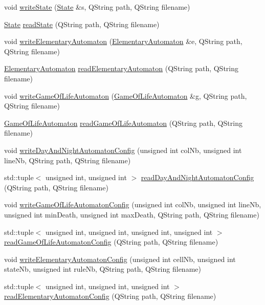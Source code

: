 \begin{DoxyCompactItemize}
\item 
void \mbox{\hyperlink{class_xml_automaton_data_manager_ae184eee52e68ad5557a01ab2b3f697a8}{write\+State}} (\mbox{\hyperlink{class_state}{State}} \&s, Q\+String path, Q\+String filename)
\item 
\mbox{\hyperlink{class_state}{State}} \mbox{\hyperlink{class_xml_automaton_data_manager_a5d5eea4ab9989ee0e412c38d56aa5fcf}{read\+State}} (Q\+String path, Q\+String filename)
\item 
void \mbox{\hyperlink{class_xml_automaton_data_manager_a4cd67227e959b0f302eb8d2214477886}{write\+Elementary\+Automaton}} (\mbox{\hyperlink{class_elementary_automaton}{Elementary\+Automaton}} \&e, Q\+String path, Q\+String filename)
\item 
\mbox{\hyperlink{class_elementary_automaton}{Elementary\+Automaton}} \mbox{\hyperlink{class_xml_automaton_data_manager_a1bfbd91aa176a1b18ee87630eec9929d}{read\+Elementary\+Automaton}} (Q\+String path, Q\+String filename)
\item 
void \mbox{\hyperlink{class_xml_automaton_data_manager_a60e0ea7435a89d2ca6508db1ba83ae2b}{write\+Game\+Of\+Life\+Automaton}} (\mbox{\hyperlink{class_game_of_life_automaton}{Game\+Of\+Life\+Automaton}} \&g, Q\+String path, Q\+String filename)
\item 
\mbox{\hyperlink{class_game_of_life_automaton}{Game\+Of\+Life\+Automaton}} \mbox{\hyperlink{class_xml_automaton_data_manager_a23c0c0d1a7f5041f5969045e7cee1bdf}{read\+Game\+Of\+Life\+Automaton}} (Q\+String path, Q\+String filename)
\item 
void \mbox{\hyperlink{class_xml_automaton_data_manager_a790cebac70b205d4b527227372ac91ba}{write\+Day\+And\+Night\+Automaton\+Config}} (unsigned int col\+Nb, unsigned int line\+Nb, Q\+String path, Q\+String filename)
\item 
std\+::tuple$<$ unsigned int, unsigned int $>$ \mbox{\hyperlink{class_xml_automaton_data_manager_a1ae0eceb9259b11a80fc62e9f694773a}{read\+Day\+And\+Night\+Automaton\+Config}} (Q\+String path, Q\+String filename)
\item 
void \mbox{\hyperlink{class_xml_automaton_data_manager_ab028d9318b2243d6a48fc352a5988a90}{write\+Game\+Of\+Life\+Automaton\+Config}} (unsigned int col\+Nb, unsigned int line\+Nb, unsigned int min\+Death, unsigned int max\+Death, Q\+String path, Q\+String filename)
\item 
std\+::tuple$<$ unsigned int, unsigned int, unsigned int, unsigned int $>$ \mbox{\hyperlink{class_xml_automaton_data_manager_ac1f0bb8c4dbb2e21828132f58613718f}{read\+Game\+Of\+Life\+Automaton\+Config}} (Q\+String path, Q\+String filename)
\item 
void \mbox{\hyperlink{class_xml_automaton_data_manager_acbf0f11aba6cb2bf77c4e44b1685cf05}{write\+Elementary\+Automaton\+Config}} (unsigned int cell\+Nb, unsigned int state\+Nb, unsigned int rule\+Nb, Q\+String path, Q\+String filename)
\item 
std\+::tuple$<$ unsigned int, unsigned int, unsigned int $>$ \mbox{\hyperlink{class_xml_automaton_data_manager_a41937afcc79edb40a3077351aa529a3a}{read\+Elementary\+Automaton\+Config}} (Q\+String path, Q\+String filename)
\end{DoxyCompactItemize}
